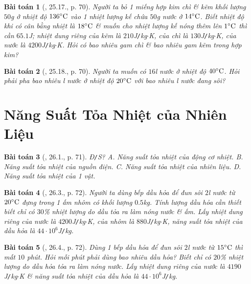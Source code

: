 \documentclass{article}
\newtheorem{baitoan}{Bài toán}
\begin{document}
\begin{baitoan}[\cite{SBT_Vat_Ly_8}, 25.17., p. 70]
	Người ta bỏ 1 miếng hợp kim chì \& kẽm khối lượng $50$\emph{g} ở nhiệt độ $136^\circ{\rm C}$ vào 1 nhiệt lượng kế chứa $50$\emph{g} nước ở $14^\circ{\rm C}$. Biết nhiệt độ khi có cân bằng nhiệt là $18^\circ{\rm C}$ \& muốn cho nhiệt lượng kế nóng thêm lên $1^\circ{\rm C}$ thì cần $65.1$\emph{J}; nhiệt dung riêng của kẽm là $210$\emph{J\texttt{/}kg$\cdot$K}, của chì là $130$\emph{J\texttt{/}kg$\cdot$K}, của nước là $4200$\emph{J\texttt{/}kg$\cdot$K}. Hỏi có bao nhiêu gam chì \& bao nhiêu gam kẽm trong hợp kim?
\end{baitoan}

\begin{baitoan}[\cite{SBT_Vat_Ly_8}, 25.18., p. 70]
	Người ta muốn có $16$\emph{l} nước ở nhiệt độ $40^\circ{\rm C}$. Hỏi phải pha bao nhiêu \emph{l} nước ở nhiệt độ $20^\circ{\rm C}$ với bao nhiêu \emph{l} nước đang sôi?
\end{baitoan}


\section{Năng Suất Tỏa Nhiệt của Nhiên Liệu}

\begin{baitoan}[\cite{SBT_Vat_Ly_8}, 26.1., p. 71]
	\emph{Đ\texttt{/}S?} {\sf A.} Năng suất tỏa nhiệt của động cơ nhiệt. {\sf B.} Năng suất tỏa nhiệt của nguồn điện. {\sf C.} Năng suất tỏa nhiệt của nhiên liệu. {\sf D.} Năng suất tỏa nhiệt của 1 vật.
\end{baitoan}

\begin{baitoan}[\cite{SBT_Vat_Ly_8}, 26.3., p. 72]
	Người ta dùng bếp dầu hỏa để đun sôi $2$\emph{l} nước từ $20^\circ{\rm C}$ đựng trong 1 ấm nhôm có khối lượng $0.5$\emph{kg}. Tính lượng dầu hỏa cần thiết biết chỉ có $30$\% nhiệt lượng do dầu tỏa ra làm nóng nước \& ấm. Lấy nhiệt dung riêng của nước là $4200$\emph{J\texttt{/}kg$\cdot$K}, của nhôm là $880$\emph{J\texttt{/}kg$\cdot$K}, năng suất tỏa nhiệt của dầu hỏa là $44\cdot10^6$\emph{J\texttt{/}kg}.
\end{baitoan}

\begin{baitoan}[\cite{SBT_Vat_Ly_8}, 26.4., p. 72]
	Dùng 1 bếp dầu hỏa để đun sôi $2$\emph{l} nước từ $15^\circ{\rm C}$ thì mất $10$ phút. Hỏi mỗi phút phải dùng bao nhiêu dầu hỏa? Biết chỉ có $20$\% nhiệt lượng do dầu hỏa tỏa ra làm nóng nước. Lấy nhiệt dung riêng của nước là $4190$\emph{J\texttt{/}kg$\cdot$K} \& năng suất tỏa nhiệt của dầu hỏa là $44\cdot10^6$\emph{J\texttt{/}kg}.
\end{baitoan}
\end{document}
